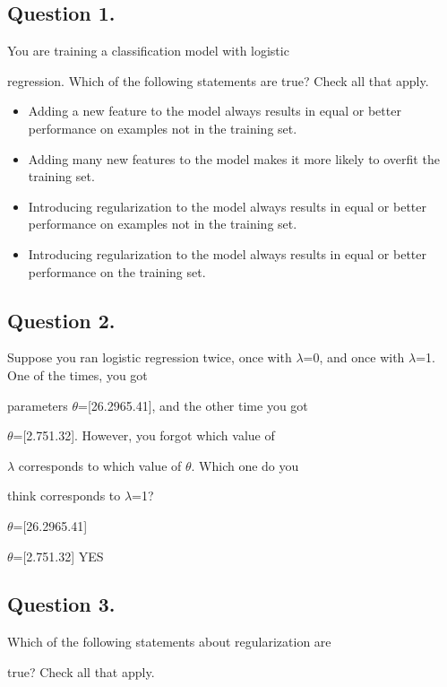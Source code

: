 	\subsection{Question 1. } 
	You are training a classification model with logistic
	
	regression. Which of the following statements are true? Check 
	all that apply.
	
	\begin{itemize}
		\item 
		Adding a new feature to the model always results in equal or better performance on examples not in the training set.
		\item 
		Adding many new features to the model makes it more likely to overfit the training set.
		\item 
		Introducing regularization to the model always results in equal or better performance on examples not in the training set.
		\item 
		Introducing regularization to the model always results in equal or better performance on the training set.
	\end{itemize}
	\subsection{Question 2. } 
	Suppose you ran logistic regression twice, once with $\lambda$=0, and once with $\lambda$=1. One of the times, you got
	
	parameters $\theta$=[26.2965.41], and the other time you got
	
	$\theta$=[2.751.32]. However, you forgot which value of
	
	$\lambda$ corresponds to which value of $\theta$. Which one do you
	
	think corresponds to $\lambda$=1?
	
	$\theta$=[26.2965.41]
	
	$\theta$=[2.751.32]  YES
	\subsection{Question 3. } 
	Which of the following statements about regularization are
	
	true? Check all that apply.
	

